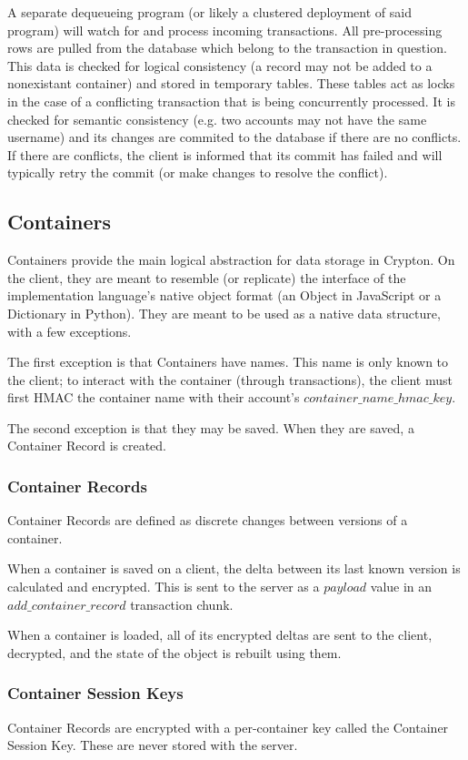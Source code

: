 \documentclass[conference]{IEEEtran}
\begin{document}
A separate dequeueing program (or likely a clustered deployment of said program) 
will watch for and process incoming transactions. All pre-processing rows are
pulled from the database which belong to the transaction in question. This
data is checked for logical consistency (a record may not be added to a
nonexistant container) and stored in temporary tables. These tables act as
locks in the case of a conflicting transaction that is being concurrently processed.
It is checked for semantic consistency (e.g. two accounts may not have the same username)
and its changes are commited to the database if there are no conflicts. If there are
conflicts, the client is informed that its commit has failed and will typically
retry the commit (or make changes to resolve the conflict).

\subsection{Containers}
Containers provide the main logical abstraction for data storage in Crypton.
On the client, they are meant to resemble (or replicate) the interface of
the implementation language's native object format (an Object in JavaScript or
a Dictionary in Python). They are meant to be used as a native data structure,
with a few exceptions.

The first exception is that Containers have names. This name is only known to
the client; to interact with the container (through transactions),
the client must first HMAC the container name with their account's
\(container\_name\_hmac\_key\).

The second exception is that they may be saved. When they are saved, a
Container Record is created.

\subsubsection{Container Records}
Container Records are defined as discrete changes between versions of a
container.

When a container is saved on a client, the delta between its
last known version is calculated and encrypted. This is sent to the server
as a \(payload\) value in an \(add\_container\_record\) transaction chunk.

When a container is loaded, all of its encrypted deltas are sent to the
client, decrypted, and the state of the object is rebuilt using them.

\subsubsection{Container Session Keys}
Container Records are encrypted with a per-container key called the Container
Session Key. These are never stored with the server.
\end{document}
